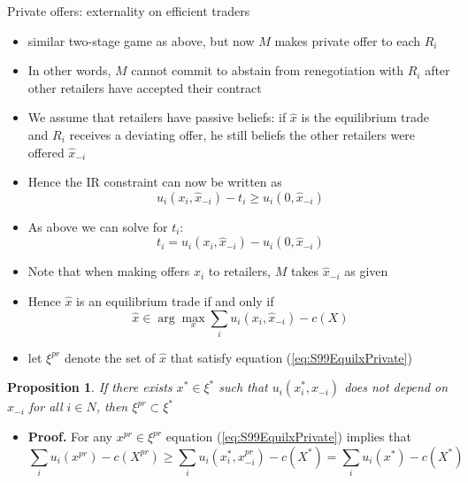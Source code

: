 \documentclass[11pt,english]{beamer}
\newtheorem{proposition}{Proposition}
\begin{document}
\begin{frame}[allowframebreaks]{Private offers: externality on
    efficient traders}
  \begin{itemize}
  \item similar two-stage game as above, but now $M$ makes private
    offer to each $R_i$
  \item In other words, $M$ cannot commit to abstain from
    renegotiation with $R_i$ after other retailers have accepted their
    contract
  \item We assume that retailers have passive beliefs: if $\hat{x}$ is
    the equilibrium trade and $R_i$ receives a deviating offer, he
    still beliefs the other retailers were offered $\hat{x}_{-i}$
  \item Hence the IR constraint can now be written as
    \begin{equation}
      \label{eq:S99IRprivate}
      u_i(x_i,\hat{x}_{-i}) - t_i \geq u_i(0,\hat{x}_{-i})
    \end{equation}
  \item As above we can solve for $t_i$:
    \begin{equation*}
      t_i = u_i(x_i,\hat{x}_{-i})-u_i(0,\hat{x}_{-i})
    \end{equation*}
  \item Note that when making offers $x_i$ to retailers, $M$ takes
    $\hat{x}_{-i}$ as given
  \item Hence $\hat{x}$ is an equilibrium trade if and only if
    \begin{equation}
      \label{eq:S99EquilxPrivate}
      \hat{x} \in \arg \max_x \sum_i u_i(x_i,\hat{x}_{-i}) -c(X)
    \end{equation}
  \item let $\xi^{pr}$ denote the set of $\hat{x}$ that satisfy
    equation (\ref{eq:S99EquilxPrivate})
  \end{itemize}
  \begin{proposition}
    If there exists $x^* \in \xi^*$ such that $u_i(x_i^*,x_{-i})$ does
    not depend on $x_{-i}$ for all $i \in N$, then $\xi^{pr} \subset \xi^*$
  \end{proposition}
  \begin{itemize}
  \item \textbf{Proof.} For any $x^{pr} \in \xi^{pr}$ equation
    (\ref{eq:S99EquilxPrivate}) implies that
    \begin{equation*}
      \sum_i u_i(x^{pr})-c(X^{pr}) \geq  \sum_i
      u_i(x_i^*,x_{-i}^{pr})-c(X^*) =  \sum_i u_i(x^{*})-c(X^{*})

\end{equation*}
\end{itemize}
\end{frame}
\end{document}
